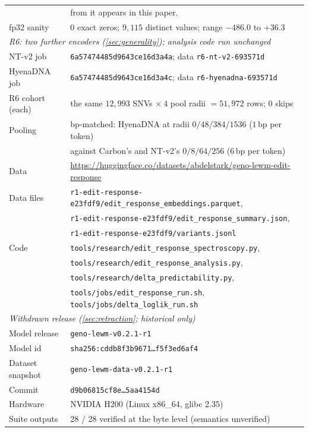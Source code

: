{\begin{table}[H]
\begin{tabular}{ll}
                       & from it appears in this paper. \\
    fp32 sanity        & $0$ exact zeros; $9{,}115$ distinct values; range $-486.0$ to $+36.3$ \\
    \midrule
    \multicolumn{2}{l}{\emph{R6: two further encoders (\cref{sec:generality}); analysis code run unchanged}}\\
    NT-v2 job          & \texttt{6a57474485d9643ce16d3a4a}; data \texttt{r6-nt-v2-693571d} \\
    HyenaDNA job       & \texttt{6a57474485d9643ce16d3a4c}; data \texttt{r6-hyenadna-693571d} \\
    R6 cohort (each)   & the same $12{,}993$ SNVs $\times\ 4$ pool radii $=51{,}972$ rows; $0$ skips \\
    Pooling            & bp-matched: HyenaDNA at radii $0/48/384/1536$ ($1$\,bp per token) \\
                       & against Carbon's and NT-v2's $0/8/64/256$ ($6$\,bp per token) \\
    \midrule
    Data               & \scriptsize\url{https://huggingface.co/datasets/abdelstark/geno-lewm-edit-response} \\
    Data files         & \texttt{r1-edit-response-e23fdf9/edit\_response\_embeddings.parquet}, \\
                       & \texttt{r1-edit-response-e23fdf9/edit\_response\_summary.json}, \\
                       & \texttt{r1-edit-response-e23fdf9/variants.jsonl} \\
    Code               & \texttt{tools/research/edit\_response\_spectroscopy.py}, \\
                       & \texttt{tools/research/edit\_response\_analysis.py}, \\
                       & \texttt{tools/research/delta\_predictability.py}, \\
                       & \texttt{tools/jobs/edit\_response\_run.sh}, \texttt{tools/jobs/delta\_loglik\_run.sh} \\
    \midrule
    \multicolumn{2}{l}{\emph{Withdrawn release (\cref{sec:retraction}; historical only)}}\\
    Model release    & \texttt{geno-lewm-v0.2.1-r1} \\
    Model id         & \texttt{sha256:cddb8f3b9671\ldots f5f3ed6af4} \\
    Dataset snapshot & \texttt{geno-lewm-data-v0.2.1-r1} \\
    Commit           & \texttt{d9b06815cf8e\ldots5aa4154d} \\
    Hardware         & NVIDIA H200 (Linux x86\_64, glibc 2.35) \\
    Suite outputs    & 28 / 28 verified at the byte level (semantics unverified) \\
    \bottomrule
  \end{tabular}
\end{table}}
